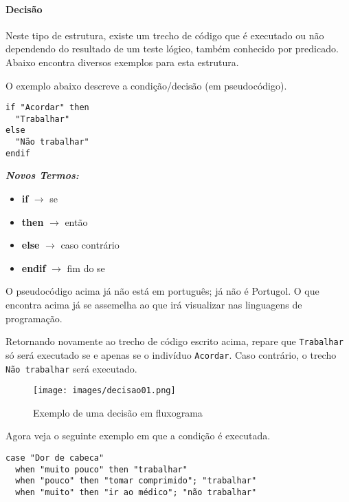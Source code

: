 \paragraph{Decisão}

Neste tipo de estrutura, existe um trecho de código que é executado ou não dependendo do resultado de um teste lógico, também conhecido por predicado. Abaixo encontra diversos exemplos para esta estrutura.

O exemplo abaixo descreve a condição/decisão  (em pseudocódigo).

\begin{lstlisting}
if "Acordar" then        
  "Trabalhar"        
else      
  "Não trabalhar"        
endif   
\end{lstlisting}

\textit{\textbf{Novos Termos:}}

\begin{itemize}
	\item \textbf{if} \(\rightarrow\) se
	\item \textbf{then} \(\rightarrow\) então
	\item \textbf{else} \(\rightarrow\) caso contrário
	\item \textbf{endif} \(\rightarrow\) fim do se
\end{itemize}

O pseudocódigo acima já não está em português; já não é Portugol. O que encontra acima já se assemelha ao que irá visualizar nas linguagens de programação.

Retornando novamente ao trecho de código escrito acima, repare que \texttt{Trabalhar} só será executado se e apenas se o indivíduo \texttt{Acordar}. Caso contrário, o trecho \texttt{Não trabalhar} será executado.

\begin{figure}[!h]
\center\texttt{[image: images/decisao01.png]}
\caption{Exemplo de uma decisão em fluxograma}
\end{figure}
 
Agora veja o seguinte exemplo em que a condição  é executada.

\begin{lstlisting}
case "Dor de cabeca"        
  when "muito pouco" then "trabalhar"        
  when "pouco" then "tomar comprimido"; "trabalhar"        
  when "muito" then "ir ao médico"; "não trabalhar"    
\end{lstlisting}

